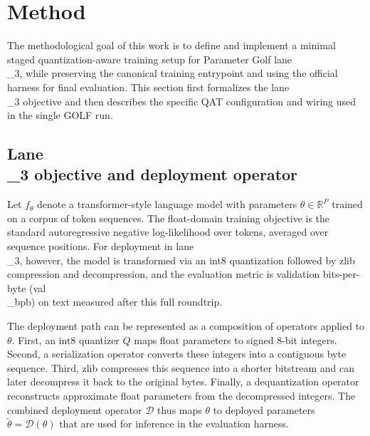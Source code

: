 \documentclass{article}
\begin{document}
\section{Method}

\label{sec:method}

The methodological goal of this work is to define and implement a minimal staged quantization-aware training setup for Parameter Golf lane\\_3, while preserving the canonical training entrypoint and using the official harness for final evaluation. This section first formalizes the lane\\_3 objective and then describes the specific QAT configuration and wiring used in the single GOLF run.

\subsection{Lane\\_3 objective and deployment operator}

\label{sec:lane_3_objective_and_deployment_operator}

Let \( f_\theta \) denote a transformer-style language model with parameters \( \theta \in \mathbb{R}^P \) trained on a corpus of token sequences. The float-domain training objective is the standard autoregressive negative log-likelihood over tokens, averaged over sequence positions. For deployment in lane\\_3, however, the model is transformed via an int8 quantization followed by zlib compression and decompression, and the evaluation metric is validation bits-per-byte (val\\_bpb) on text measured after this full roundtrip.

The deployment path can be represented as a composition of operators applied to \( \theta \). First, an int8 quantizer \( Q \) maps float parameters to signed 8-bit integers. Second, a serialization operator converts these integers into a contiguous byte sequence. Third, zlib compresses this sequence into a shorter bitstream and can later decompress it back to the original bytes. Finally, a dequantization operator reconstructs approximate float parameters from the decompressed integers. The combined deployment operator \( \mathcal{D} \) thus maps \( \theta \) to deployed parameters \( \tilde{\theta} = \mathcal{D}(\theta) \) that are used for inference in the evaluation harness.
\end{document}
